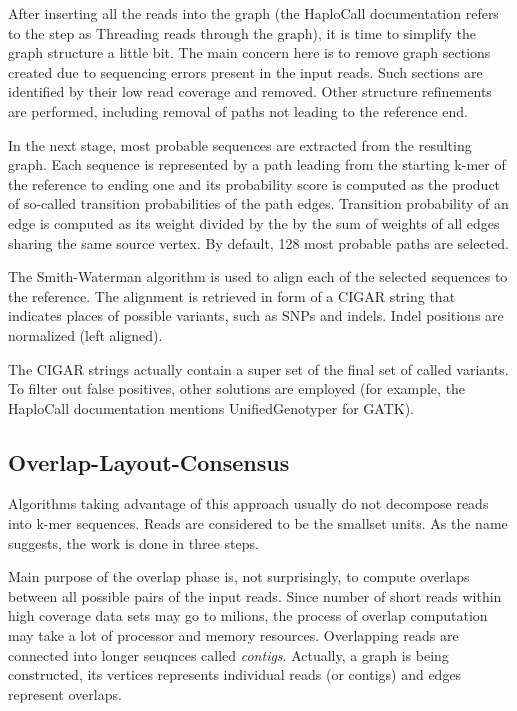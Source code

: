 After inserting all the reads into the graph (the HaploCall documentation refers to the step as Threading reads through the graph), it is time to simplify the graph structure a little bit. The main concern here is to remove graph sections created due to sequencing errors present in the input reads. Such sections are identified by their low read coverage and removed. Other structure refinements are performed, including removal of paths not leading to the reference end.

In the next stage, most probable sequences are extracted from the resulting graph. Each sequence is represented by a path leading from the starting k-mer of the reference to ending one and its probability score is computed as the product of so-called transition probabilities of the path edges. Transition probability of an edge is computed as its weight divided by the by the sum of weights of all edges sharing the same source vertex. By default, 128 most probable paths are selected.

The Smith-Waterman algorithm is used to align each of the selected sequences to the reference. The alignment is retrieved in form of a CIGAR string that indicates places of possible variants, such as SNPs and indels. Indel positions are normalized (left aligned). 

The CIGAR strings actually contain a super set of the final set of called variants. To filter out false positives, other solutions are employed (for example, the HaploCall documentation mentions UnifiedGenotyper for GATK).

\subsection{Overlap-Layout-Consensus}
\label{subsec:overlap-layout-consensus}

Algorithms taking advantage of this approach usually do not decompose reads into k-mer sequences. Reads are considered to be the smallset units. As the name suggests, the work is done in three steps.

Main purpose of the overlap phase is, not surprisingly, to compute overlaps between all possible pairs of the input reads. Since number of short reads within high coverage data sets may go to milions, the process of overlap computation may take a lot of processor and memory resources. Overlapping reads are connected into longer seuqnces called \textit{contigs}. Actually, a graph is being constructed, its vertices represents individual reads (or contigs) and edges represent overlaps.

